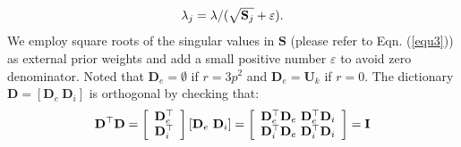 \documentclass[10pt,twocolumn,letterpaper]{article}
\begin{document}
\begin{equation}\label{equ6}\vspace{-1mm}
\lambda_{j} = \lambda/(\sqrt{\mathbf{S}_{j}}+\varepsilon).
\end{equation}
We employ square roots of the singular values in $\mathbf{S}$ (please refer to Eqn. (\ref{equ3})) as external prior weights and add a small positive number $\varepsilon$ to avoid zero denominator. Noted that $\mathbf{D}_{e}=\emptyset$ if $r=3p^{2}$ and $\mathbf{D}_{e}=\mathbf{U}_{k}$ if $r=0$. The dictionary $\mathbf{D} = [\mathbf{D}_{e}\ \mathbf{D}_{i}]$ is orthogonal by checking that:
\vspace{-2mm}
\begin{equation}\label{equ7}\vspace{-1mm}
\mathbf{D}^{\top}\mathbf{D} = 
\left[\begin{array}{c}
\mathbf{D}_{e}^{\top}
\\
\mathbf{D}_{i}^{\top}
\end{array}\right]
[\mathbf{D}_{e}\ \mathbf{D}_{i}]
=
\left[\begin{array}{cc}
\mathbf{D}_{e}^{\top}\mathbf{D}_{e}\ \mathbf{D}_{e}^{\top}\mathbf{D}_{i}
\\
\mathbf{D}_{i}^{\top}\mathbf{D}_{e}\ \mathbf{D}_{i}^{\top}\mathbf{D}_{i}
\end{array}\right]
=
\mathbf{I}
\end{equation}
\end{document}
